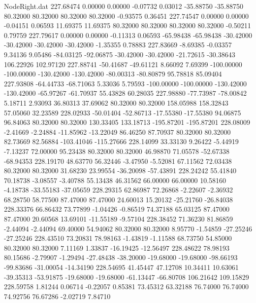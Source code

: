 \begin{filecontents}{NodeRight.dat}
 227.68474    0.00000    0.00000    -0.07732    0.03012  -35.88750  -35.88750   80.32000   80.32000   80.32000   80.32000   -0.93575    0.36451
 227.74547    0.00000    0.00000    -0.04151    0.06593   11.69375   11.69375   80.32000   80.32000   80.32000   80.32000   -0.50211    0.79759
 227.79617    0.00000    0.00000    -0.11313    0.06593  -65.98438  -65.98438  -30.42000  -30.42000  -30.42000  -30.42000   -1.35355    0.78883
 227.83669   -8.69385   -0.03357     9.34136    9.05486  -84.03125  -92.06875  -30.42000  -30.42000  -21.72615  -30.38643  106.22926  102.97120
 227.88741  -50.41687  -49.61121     8.66092    7.69399 -100.00000 -100.00000 -130.42000 -130.42000  -80.00313  -80.80879   95.78818   85.09404
 227.93808  -64.44733  -68.71063     5.33036    5.79593 -100.00000 -100.00000 -130.42000 -130.42000  -65.97267  -61.70937   55.43828   60.28035
 227.98880  -77.73987  -78.00842     5.18711    2.93093   36.80313   37.69062   80.32000   80.32000  158.05988  158.32843   57.05060   32.23589
 228.02933  -50.01404  -52.86713   -17.55380  -17.55380   94.06875   96.84063   80.32000   80.32000  130.33405  133.18713 -195.87201 -195.87201
 228.08009   -2.41669   -2.24884   -11.85962  -13.22049   86.46250   87.70937   80.32000   80.32000   82.73669   82.56884 -103.41046 -115.27666
 228.14099   33.33130    9.26422    -5.44919   -7.13237   72.00000   95.23438   80.32000   80.32000   46.98870   71.05578  -52.67338  -68.94353
 228.19170   48.63770   56.32446    -3.47950   -5.52081   67.11562   72.03438   80.32000   80.32000   31.68230   23.99554  -36.20098  -57.43891
 228.24242   55.41840   70.18738    -3.08557   -3.40788   55.13438   46.31562   66.00000   66.00000   10.58160   -4.18738  -33.55183  -37.05659
 228.29315   62.86987   72.26868    -2.22607   -2.36932   68.28750   58.77500   87.47000   87.47000   24.60013   15.20132  -25.21760  -26.84038
 228.33376   66.86432   73.77899    -1.04426   -0.86519   74.37188   65.03125   87.47000   87.47000   20.60568   13.69101  -11.55189   -9.57104
 228.38452   71.36230   81.86859    -2.44094   -2.44094   69.40000   54.94062   80.32000   80.32000    8.95770   -1.54859  -27.25246  -27.25246
 228.43510   73.20831   78.98163    -1.43819   -1.11588   68.73750   54.85000   80.32000   80.32000    7.11169    1.33837  -16.19425  -12.56497
 228.48622   78.98193   80.15686    -2.79907   -1.29494  -27.48438  -38.20000  -19.68000  -19.68000  -98.66193  -99.83686  -31.00054  -14.34190
 228.54695   41.45447   47.12708    10.34411   10.63061  -39.35313  -53.91875  -19.68000  -19.68000  -61.13447  -66.80708  106.21642  109.15829
 228.59758    1.81244    0.06714    -0.22057    0.85381   73.45312   63.32188   76.74000   76.74000   74.92756   76.67286   -2.02719    7.84710

\end{filecontents}
